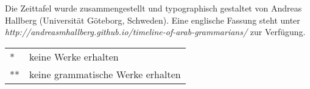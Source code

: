 \documentclass[a4paper,10pt,landscape, onesided]{article}
\begin{document}
\vfill

\null
\begin{minipage}[t]{7cm}
\footnotesize
Die Zeittafel wurde zusammengestellt und typographisch
gestaltet von Andreas Hallberg (Universität Göteborg, Schweden).
Eine englische Fassung steht unter
\textit{http://andreasmhallberg.github.io/\break timeline-of-arab-grammarians/}
zur Verfügung.
\end{minipage}
\hfill
\begin{tabular}[t]{l@{~}l}
          *&keine Werke erhalten\\
          {**} & keine grammatische Werke erhalten\\
\end{tabular}
\end{document}
